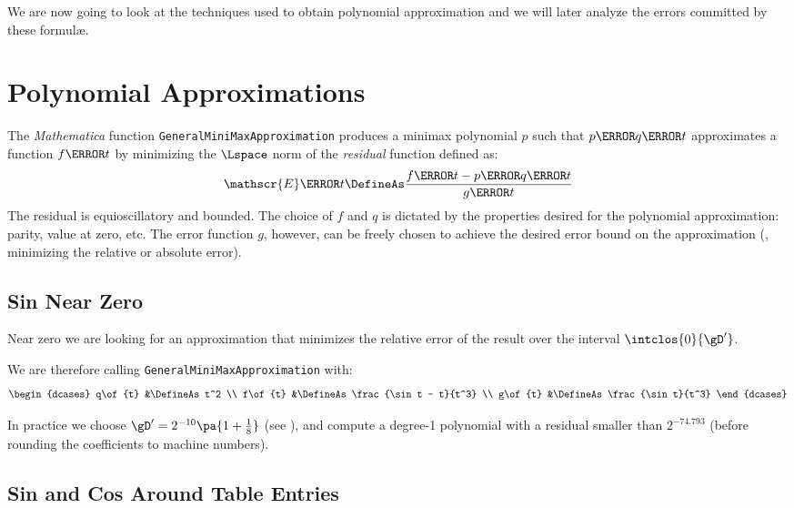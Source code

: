 \documentclass[10pt, a4paper, twoside]{basestyle}
\begin{document}
We are now going to look at the techniques used to obtain polynomial approximation and we will later analyze the errors committed by these formulæ.

\section*{Polynomial Approximations}

The \textit{Mathematica} function \texttt{GeneralMiniMaxApproximation} produces a minimax polynomial $p$ such that $p\of{q\of{t}}$ approximates a function $f\of{t}$ by minimizing the $\Lspace$ norm of the \emph{residual} function defined as:
\[
\mathscr{E}\of{t} \DefineAs \frac{f\of{t} - p\of{q\of{t}}}{g\of{t}}
\]
The residual is equioscillatory and bounded.  The choice of $f$ and $q$ is dictated by the properties desired for the polynomial approximation: parity, value at zero, etc.  The error function $g$, however, can be freely chosen to achieve the desired error bound on the approximation (\exempligratia, minimizing the relative or absolute error).

\subsection*{Sin Near Zero}

Near zero we are looking for an approximation that minimizes the relative error of the result over the interval $\intclos{0}{\gD'}$.

We are therefore calling \texttt{GeneralMiniMaxApproximation} with:
\[
\begin{dcases}
q\of{t} &\DefineAs t^2 \\
f\of{t} &\DefineAs \frac{\sin t - t}{t^3} \\
g\of{t} &\DefineAs \frac{\sin t}{t^3}
\end{dcases}
\]

In practice we choose $\gD' = 2^{-10} \pa{1 + \frac{1}{8}}$ (see ), and compute a degree-1 polynomial with a residual smaller than $2^{-74.793}$ (before rounding the coefficients to machine numbers).

\subsection*{Sin and Cos Around Table Entries}
\end{document}
